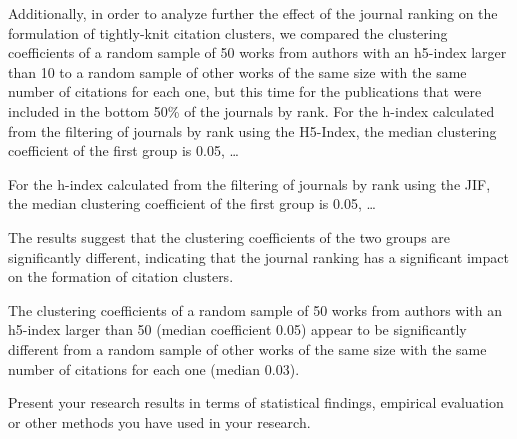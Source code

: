 Additionally, in order to analyze further the effect of the journal ranking on
the formulation of tightly-knit citation clusters, we compared the clustering
coefficients of a random sample of 50 works from authors with an h5-index
larger than 10 to a random sample of other works of the same size with the same
number of citations for each one, but this time for the publications that were
included in the bottom 50\% of the journals by rank. For the h-index calculated
from the filtering of journals by rank using the H5-Index, the median
clustering coefficient of the first group is 0.05, \dots

For the h-index calculated from the filtering of journals by rank using the
JIF, the median clustering coefficient of the first group is 0.05, \dots

The results suggest that the clustering coefficients of the two groups are
significantly different, indicating that the journal ranking has a significant
impact on the formation of citation clusters.

The clustering coefficients of a random sample of 50 works from authors with an
h5-index larger than 50 (median coefficient 0.05) appear to be significantly
different from a random sample of other works of the same size with the same
number of citations for each one (median 0.03).

Present your research results in terms of statistical findings, empirical
evaluation or other methods you have used in your research.

